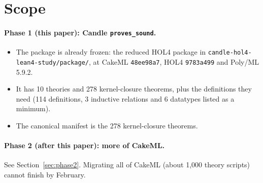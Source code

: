 \documentclass[11pt,a4paper]{article}
\newcommand{\code}[1]{\texttt{#1}}
\begin{document}
\section{Scope}
\paragraph{Phase 1 (this paper): Candle \code{proves\_sound}.}
\begin{itemize}
\item The package is already frozen: the reduced HOL4 package in \code{candle-hol4-lean4-study/package/}, at CakeML \code{48ee98a7}, HOL4 \code{9783a499} and Poly/ML 5.9.2.
\item It has 10 theories and 278 kernel-closure theorems, plus the definitions they need (114 definitions, 3 inductive relations and 6 datatypes listed as a minimum).
\item The canonical manifest is the 278 kernel-closure theorems.
\end{itemize}

\paragraph{Phase 2 (after this paper): more of CakeML.} See Section~\ref{sec:phase2}. Migrating all of CakeML (about 1{,}000 theory scripts) cannot finish by February.
\end{document}
